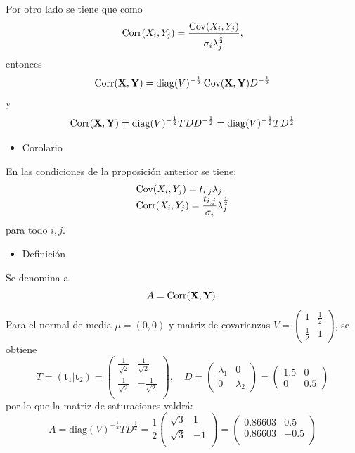 Por otro lado se tiene que como \[ \operatorname{Corr}(X_i,Y_j)=\dfrac{\operatorname{Cov}(X_i,Y_j)}{\sigma_i\lambda_j^{\frac{1}{2}}}, \]entonces \[ \operatorname{Corr}(\mathbf{X,Y})=\mathrm{diag}(V)^{-\frac{1}{2}}\operatorname{Cov}(\mathbf{X,Y})D^{-\frac{1}{2}} \]y\[ \operatorname{Corr}(\mathbf{X,Y})=\mathrm{diag}(V)^{-\frac{1}{2}}TDD^{-\frac{1}{2}}=\mathrm{diag}(V)^{-\frac{1}{2}}TD^{\frac{1}{2}} \]
\begin{itemize}[label=\color{red}\textbullet, leftmargin=*]
	\item \color{lightblue}Corolario
\end{itemize}
En las condiciones de la proposición anterior se tiene: \[ \begin{array}{l}
	\operatorname{Cov}(X_i,Y_j)=t_{i,j}\lambda_j\\
	\operatorname{Corr}(X_i,Y_j)=\dfrac{t_{i,j}}{\sigma_i}\lambda_j^{\frac{1}{2}}
\end{array} \] para todo $i,j$.
\begin{itemize}[label=\color{red}\textbullet, leftmargin=*]
	\item \color{lightblue}Definición
\end{itemize}
Se denomina  a \[ A=\operatorname{Corr}(\mathbf{X,Y}). \]
\Ej
Para el \vea normal de media $\mu=(0,0)$ y matriz de covarianzas $V=\begin{pmatrix}
	1 & \tfrac{1}{2}\\
	\tfrac{1}{2} & 1
\end{pmatrix}$, se obtiene \[ T=(\mathbf{t}_1|\mathbf{t}_2)=\begin{pmatrix}
\frac{1}{\sqrt{2}} & \frac{1}{\sqrt{2}}\\
\frac{1}{\sqrt{2}} & -\frac{1}{\sqrt{2}}\\
\end{pmatrix},\quad D=\begin{pmatrix}
\lambda_1 & 0\\
0 & \lambda_2
\end{pmatrix}=\begin{pmatrix}
1.5 & 0\\
0 & 0.5
\end{pmatrix} \]por lo que la matriz de saturaciones valdrá: \[ A=\mathrm{diag}(V)^{-\frac{1}{2}}TD^{\frac{1}{2}}=\dfrac{1}{2}\begin{pmatrix}
\sqrt{3} & 1\\
\sqrt{3} & -1\\
\end{pmatrix}=\begin{pmatrix}
0.86603 & 0.5\\
0.86603 & -0.5\\
\end{pmatrix} \]

